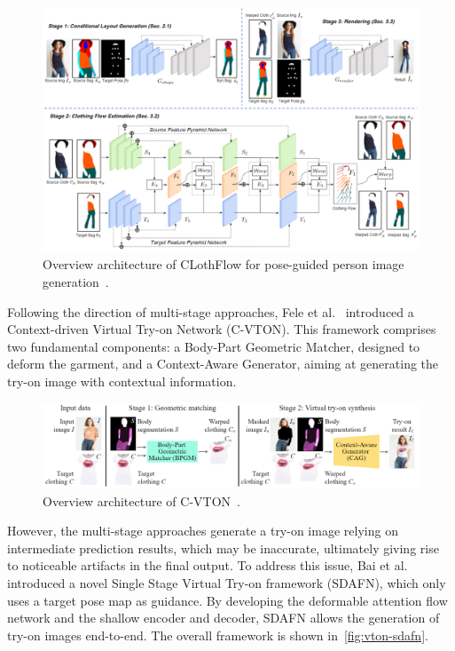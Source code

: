\begin{figure}[h!]
    \centering
    \includegraphics[width=\linewidth]{content/resources/images/literature-review/clothflow.png}
    \caption{Overview architecture of CLothFlow for pose-guided person image generation~\cite{Han-ICCV2019-Clothflow}.}
    \label{fig:vton-clothflow}
\end{figure}

Following the direction of multi-stage approaches, Fele et al.~\cite{Fele-WACV2022-CVTON} introduced a Context-driven Virtual Try-on Network (C-VTON). This framework comprises two fundamental components: a Body-Part Geometric Matcher, designed to deform the garment, and a Context-Aware Generator, aiming at generating the try-on image with contextual information.

\begin{figure}[h!]
    \centering
    \includegraphics[width=\linewidth]{content/resources/images/literature-review/cvton.png}
    \caption{Overview architecture of C-VTON~\cite{Fele-WACV2022-CVTON}.}
    \label{fig:vton-cvton}
\end{figure}

However, the multi-stage approaches generate a try-on image relying on intermediate prediction results, which may be inaccurate, ultimately giving rise to noticeable artifacts in the final output. To address this issue, Bai et al.~\cite{Bai-ECCV2022-Single} introduced a novel Single Stage Virtual Try-on framework (SDAFN), which only uses a target pose map as guidance. By developing the deformable attention flow network and the shallow encoder and decoder, SDAFN allows the generation of try-on images end-to-end. The overall framework is shown in~\autoref{fig:vton-sdafn}.

